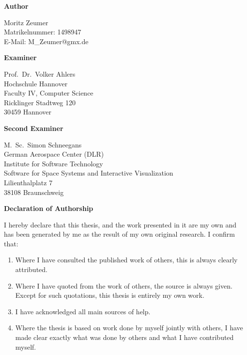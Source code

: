 \documentclass[11pt,DIV=12,BCOR=0mm,twoside,openright,headings=normal,%
  numbers=noenddot,headsepline,headinclude]{scrreprt}
\begin{document}
    \cleardoublepage

    \noindent
    {\sffamily\bfseries Author}

    \vspace*{.5\baselineskip}
    \noindent
    Moritz Zeumer\\
    Matrikelnummer: 1498947\\
    E-Mail: M\_Zeumer@gmx.de

    \vspace*{1\baselineskip}
    \noindent
    {\sffamily\bfseries Examiner}

    \vspace*{.5\baselineskip}
    \noindent
    Prof.\ Dr.\ Volker Ahlers\\
    Hochschule Hannover\\
    Faculty IV, Computer Science\\
    Ricklinger Stadtweg 120\\
    30459 Hannover

    \vspace*{1\baselineskip}
    \noindent
    {\sffamily\bfseries Second Examiner}

    \vspace*{.5\baselineskip}
    \noindent
    M.\ Sc.\ Simon Schneegans\\
    German Aerospace Center (DLR)\\
    Institute for Software Technology\\
    Software for Space Systems and Interactive Visualization\\
    Lilienthalplatz 7\\
    38108 Braunschweig

    \vfill
    \noindent
    {\sffamily\bfseries Declaration of Authorship}

    \vspace*{.5\baselineskip}
    \noindent
    I hereby declare that this thesis, and the work presented in it are my own and has been generated by me as the result of my own original research.
    I confirm that:

    \begin{enumerate}
        \item Where I have consulted the published work of others, this is always clearly attributed.

        \item Where I have quoted from the work of others, the source is always given.
        Except for such quotations, this thesis is entirely my own work.

        \item I have acknowledged all main sources of help.

        \item Where the thesis is based on work done by myself jointly with others, I have made clear exactly what was done by others and what I have contributed myself.
    \end{enumerate}
\end{document}
